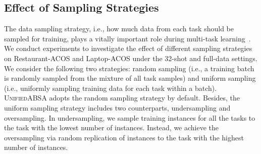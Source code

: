 \documentclass[11pt]{article}
\newcommand{\UnifiedABSA}{\textsc{UnifiedABSA}\xspace}
\begin{document}
\begin{table}[h]
\centering
\caption{Ablation study for \textsc{USI} on Restaurant-ACOS and Laptop-ACOS in terms of the average performance over 11 tasks. Note that ``options'' includes both sentiment options and category options.  ``tem.'' and ``opt.'' denote the template and options, respectively.}


\label{tab:ablation-on-usi}
\end{table}


 
\subsection{Effect of Sampling Strategies}
\label{sec:ablation-on-sampling}

The data sampling strategy, i.e., how much data from each task should be sampled for training, plays a vitally important role during multi-task learning~\cite{raffel2020t5,DBLP:journals/corr/abs-1907-05019}. We conduct experiments to investigate the effect of different sampling strategies on Restaurant-ACOS and Laptop-ACOS under the 32-shot and full-data settings. We consider the following two strategies: random sampling (i.e., a training batch is randomly sampled from the mixture of all task samples) and uniform sampling (i.e., uniformly sampling training data for each task within a batch). \UnifiedABSA adopts the random sampling strategy by default. Besides, the uniform sampling strategy includes two counterparts, undersampling and oversampling. In undersampling, we sample training instances for all the tasks to the task with the lowest number of instances. Instead, we achieve the oversampling via random replication of instances to the task with the highest number of instances.
\end{document}
